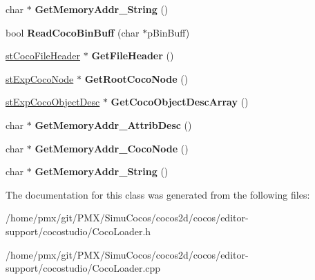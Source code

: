 \begin{DoxyCompactItemize}
char $\ast$ {\bfseries Get\+Memory\+Addr\+\_\+\+String} ()
\item 
\mbox{\label{classcocostudio_1_1CocoLoader_ad92550131fd05eaac59d586098ab6aaa}} 
bool {\bfseries Read\+Coco\+Bin\+Buff} (char $\ast$p\+Bin\+Buff)
\item 
\mbox{\label{classcocostudio_1_1CocoLoader_a2243df1d3d0002e81a99f39ebe04f936}} 
\hyperlink{structcocostudio_1_1stCocoFileHeader}{st\+Coco\+File\+Header} $\ast$ {\bfseries Get\+File\+Header} ()
\item 
\mbox{\label{classcocostudio_1_1CocoLoader_acde720ca8fd51b6f2454cbcacdc81e40}} 
\hyperlink{structcocostudio_1_1stExpCocoNode}{st\+Exp\+Coco\+Node} $\ast$ {\bfseries Get\+Root\+Coco\+Node} ()
\item 
\mbox{\label{classcocostudio_1_1CocoLoader_a5c330fcc5f38981dc07a6a8ee1bc87cd}} 
\hyperlink{structcocostudio_1_1stExpCocoObjectDesc}{st\+Exp\+Coco\+Object\+Desc} $\ast$ {\bfseries Get\+Coco\+Object\+Desc\+Array} ()
\item 
\mbox{\label{classcocostudio_1_1CocoLoader_a1d64cb55b5ed1d2a6656fb924ef70c86}} 
char $\ast$ {\bfseries Get\+Memory\+Addr\+\_\+\+Attrib\+Desc} ()
\item 
\mbox{\label{classcocostudio_1_1CocoLoader_acf0980edddcd3e4ccb0fdd9af53dba1c}} 
char $\ast$ {\bfseries Get\+Memory\+Addr\+\_\+\+Coco\+Node} ()
\item 
\mbox{\label{classcocostudio_1_1CocoLoader_a57ecd2e6f4aaf278b58e40e1a1854669}} 
char $\ast$ {\bfseries Get\+Memory\+Addr\+\_\+\+String} ()
\end{DoxyCompactItemize}


The documentation for this class was generated from the following files\+:\begin{DoxyCompactItemize}
\item 
/home/pmx/git/\+P\+M\+X/\+Simu\+Cocos/cocos2d/cocos/editor-\/support/cocostudio/Coco\+Loader.\+h\item 
/home/pmx/git/\+P\+M\+X/\+Simu\+Cocos/cocos2d/cocos/editor-\/support/cocostudio/Coco\+Loader.\+cpp\end{DoxyCompactItemize}
